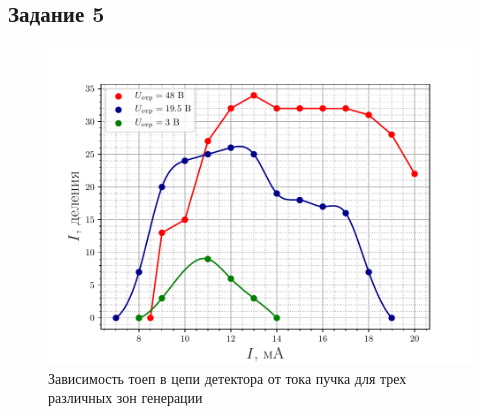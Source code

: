 
\subsection{Задание 5}
\begin{figure}[H]
		\centering
		\includegraphics[height=0.4\textheight]{fig/task5}
		\caption{Зависимость тоеп в цепи детектора от тока пучка для трех различных зон генерации}
		\label{fig:task5}
\end{figure}

